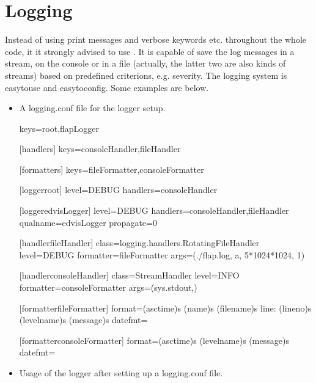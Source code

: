 \documentclass[letterpaper,10pt,english]{sphinxmanual}
\begin{document}
\section{Logging}
\label{\detokenize{styleguide:logging}}
Instead of using print messages and verbose keywords etc. throughout the whole code, it it strongly advised to use . It is capable of save the log messages in a stream, on the console or in a file (actually, the latter two are also kinds of streams) based on predefined criterions, e.g. severity. The logging system is easy\sphinxhyphen{}to\sphinxhyphen{}use and easy\sphinxhyphen{}to\sphinxhyphen{}config. Some examples are below.
\begin{itemize}
\item {} 
A logging.conf file for the logger setup.

\begin{sphinxVerbatim}[commandchars=\\\{\}]
[loggers]
keys=root,flapLogger

[handlers]
keys=consoleHandler,fileHandler

[formatters]
keys=fileFormatter,consoleFormatter

[logger\PYGZus{}root]
level=DEBUG
handlers=consoleHandler

[logger\PYGZus{}edvisLogger]
level=DEBUG
handlers=consoleHandler,fileHandler
qualname=edvisLogger
propagate=0

[handler\PYGZus{}fileHandler]
class=logging.handlers.RotatingFileHandler
level=DEBUG
formatter=fileFormatter
args=(\PYGZsq{}./flap.log\PYGZsq{}, \PYGZsq{}a\PYGZsq{}, 5*1024*1024, 1)

[handler\PYGZus{}consoleHandler]
class=StreamHandler
level=INFO
formatter=consoleFormatter
args=(sys.stdout,)

[formatter\PYGZus{}fileFormatter]
format=\PYGZpc{}(asctime)s \PYGZhy{} \PYGZpc{}(name)s \PYGZhy{} \PYGZpc{}(filename)s \PYGZhy{} line: \PYGZpc{}(lineno)s \PYGZhy{}
\PYGZpc{}(levelname)s \PYGZhy{} \PYGZpc{}(message)s
datefmt=

[formatter\PYGZus{}consoleFormatter]
format=\PYGZpc{}(asctime)s \PYGZhy{} \PYGZpc{}(levelname)s \PYGZhy{} \PYGZpc{}(message)s
datefmt=
\end{sphinxVerbatim}

\item {} 
Usage of the logger after setting up a logging.conf file.

\begin{sphinxVerbatim}[commandchars=\\\{\}]
 
 


\end{sphinxVerbatim}
\end{itemize}
\end{document}
